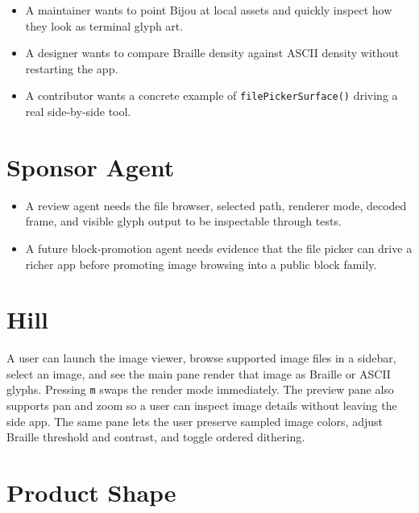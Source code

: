 \begin{itemize}
\tightlist
\item
  A maintainer wants to point Bijou at local assets and quickly inspect how they look as terminal glyph art.
\item
  A designer wants to compare Braille density against ASCII density without restarting the app.
\item
  A contributor wants a concrete example of \texttt{f\allowbreak{}i\allowbreak{}l\allowbreak{}e\allowbreak{}P\allowbreak{}i\allowbreak{}c\allowbreak{}k\allowbreak{}e\allowbreak{}r\allowbreak{}S\allowbreak{}u\allowbreak{}r\allowbreak{}f\allowbreak{}a\allowbreak{}c\allowbreak{}e\allowbreak{}(\allowbreak{})} driving a real side-by-side tool.
\end{itemize}

\section{Sponsor Agent}\label{record-137-sponsor-agent}

\begin{itemize}
\tightlist
\item
  A review agent needs the file browser, selected path, renderer mode, decoded frame, and visible glyph output to be inspectable through tests.
\item
  A future block-promotion agent needs evidence that the file picker can drive a richer app before promoting image browsing into a public block family.
\end{itemize}

\section{Hill}\label{record-137-hill}

A user can launch the image viewer, browse supported image files in a sidebar, select an image, and see the main pane render that image as Braille or ASCII glyphs. Pressing \texttt{m} swaps the render mode immediately. The preview pane also supports pan and zoom so a user can inspect image details without leaving the side app. The same pane lets the user preserve sampled image colors, adjust Braille threshold and contrast, and toggle ordered dithering.

\section{Product Shape}\label{record-137-product-shape}

